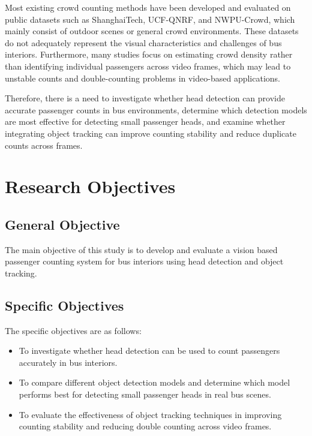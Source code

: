 \documentclass[12pt,a4paper]{report}
\begin{document}
Most existing crowd counting methods have been developed and evaluated on public datasets such as ShanghaiTech\cite{Zhu2020}, UCF-QNRF\cite{ucf_qnrf_dataset}, and NWPU-Crowd\cite{wang2020nwpu}, which mainly consist of outdoor scenes or general crowd environments. These datasets do not adequately represent the visual characteristics and challenges of bus interiors. Furthermore, many studies focus on estimating crowd density rather than identifying individual passengers across video frames, which may lead to unstable counts and double-counting problems in video-based applications.

Therefore, there is a need to investigate whether head detection can provide accurate passenger counts in bus environments, determine which detection models are most effective for detecting small passenger heads, and examine whether integrating object tracking can improve counting stability and reduce duplicate counts across frames.

\section{Research Objectives}

\subsection{General Objective}

The main objective of this study is to develop and evaluate a vision based passenger counting system for bus interiors using head detection and object tracking.

\subsection{Specific Objectives}

The specific objectives are as follows:

\begin{itemize}[itemsep=0pt]
    \item To investigate whether head detection can be used to count passengers accurately in bus interiors.
    
    \item To compare different object detection models and determine which model performs best for detecting small passenger heads in real bus scenes.
    
    \item To evaluate the effectiveness of object tracking techniques in improving counting stability and reducing double counting across video frames.
    
\end{itemize}
\end{document}

